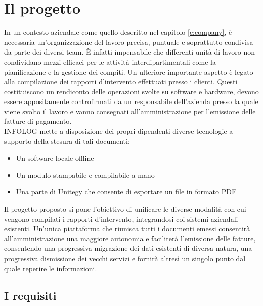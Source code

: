 \chapter{Il progetto}\label{c:project}

In un contesto aziendale come quello descritto nel capitolo \ref{c:company}, è necessaria un'organizzazione del lavoro precisa, puntuale e soprattutto condivisa da parte dei diversi team.
È infatti impensabile che differenti unità di lavoro non condividano mezzi efficaci per le attività interdipartimentali come la pianificazione e la gestione dei compiti.
Un ulteriore importante aspetto è legato alla compilazione dei rapporti d'intervento effettuati presso i clienti.
Questi costituiscono un rendiconto delle operazioni svolte su software e hardware, devono essere appositamente controfirmati da un responsabile dell'azienda presso la quale viene svolto il lavoro
e vanno consegnati all'amministrazione per l'emissione delle fatture di pagamento.
\\
INFOLOG mette a disposizione dei propri dipendenti diverse tecnologie a supporto della stesura di tali documenti:
\begin{itemize}
    \item Un software locale offline
    \item Un modulo stampabile e compilabile a mano
    \item Una parte di Unitegy che consente di esportare un file in formato PDF
\end{itemize}
Il progetto proposto si pone l'obiettivo di unificare le diverse modalità con cui vengono compilati i rapporti d'intervento, integrandosi coi sistemi aziendali esistenti.
Un'unica piattaforma che riunisca tutti i documenti emessi consentirà all'amministrazione una maggiore autonomia e faciliterà l'emissione delle fatture, consentendo una progressiva
migrazione dei dati esistenti di diversa natura, una progressiva dismissione dei vecchi servizi e fornirà altresì un singolo punto dal quale reperire le informazioni.

\section{I requisiti}

